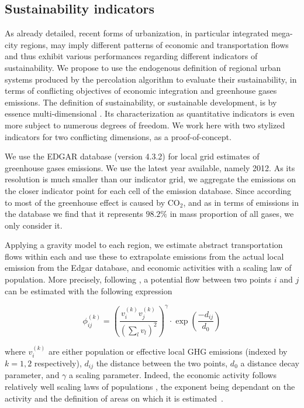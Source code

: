\documentclass{article}
\begin{document}
\subsection{Sustainability indicators}


As already detailed, recent forms of urbanization, in particular integrated mega-city regions, may imply different patterns of economic and transportation flows and thus exhibit various performances regarding different indicators of sustainability. We propose to use the endogenous definition of regional urban systems produced by the percolation algorithm to evaluate their sustainability, in terms of conflicting objectives of economic integration and greenhouse gases emissions. The definition of sustainability, or sustainable development, is by essence multi-dimensional \citep{viguie2012trade}. Its characterization as quantitative indicators is even more subject to numerous degrees of freedom. We work here with two stylized indicators for two conflicting dimensions, as a proof-of-concept.


We use the EDGAR database \citep{janssens2017edgar} (version 4.3.2) for local grid estimates of greenhouse gases emissions. We use the latest year available, namely 2012. As its resolution is much smaller than our indicator grid, we aggregate the emissions on the closer indicator point for each cell of the emission database. Since according to \cite{lashof1990relative} most of the greenhouse effect is caused by $\textrm{CO}_2$, and as in terms of emissions in the database we find that it represents $98.2\%$ in mass proportion of all gases, we only consider it.

Applying a gravity model to each region, we estimate abstract transportation flows within each and use these to extrapolate emissions from the actual local emission from the Edgar database, and economic activities with a scaling law of population.  More precisely, following \cite{raimbault2018indirect}, a potential flow between two points $i$ and $j$ can be estimated with the following expression 

\begin{equation}
\phi_{ij}^{(k)} = \left(\frac{v^{(k)}_i v^{(k)}_j}{(\sum_l v_l)^2}\right)^\gamma \cdot \exp\left(\frac{-d_{ij}}{d_0}\right)
\end{equation}

where $v^{(k)}_i$ are either population or effective local GHG emissions (indexed by $k = 1,2$ respectively), $d_{ij}$ the distance between the two points, $d_0$ a distance decay parameter, and $\gamma$ a scaling parameter. Indeed, the economic activity follows relatively well scaling laws of populations \citep{bettencourt2007growth}, the exponent being dependant on the activity and the definition of areas on which it is estimated~\citep{cottineau2017diverse}.
\end{document}
